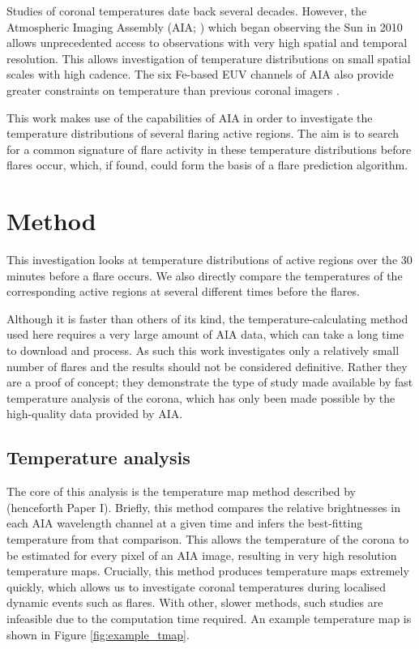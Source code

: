 \documentclass[referee,a4paper,12pt]{swsc}
\begin{document}
\begin{linenumbers}
Studies of coronal temperatures date back several decades. %
However, the Atmospheric Imaging Assembly (AIA; \cite{Lemen2011}) which began observing the Sun in 2010 allows unprecedented access to observations with very high spatial and temporal resolution.
This allows investigation of temperature distributions on small spatial scales with high cadence. %
The six Fe-based EUV channels of AIA also provide greater constraints on temperature than previous coronal imagers \citep{Guennou2012, Guennou2012a}.

This work makes use of the capabilities of AIA in order to investigate the temperature distributions of several flaring active regions.
The aim is to search for a common signature of flare activity in these temperature distributions before flares occur, which, if found, could form the basis of a flare prediction algorithm.

\section{Method}
This investigation looks at temperature distributions of active regions over the 30 minutes before a flare occurs.
We also directly compare the temperatures of the corresponding active regions at several different times before the flares.

Although it is faster than others of its kind, the temperature-calculating method used here requires a very large amount of AIA data, which can take a long time to download and process.
As such this work investigates only a relatively small number of flares and the results should not be considered definitive.
Rather they are a proof of concept; they demonstrate the type of study made available by fast temperature analysis of the corona, which has only been made possible by the high-quality data provided by AIA.

\subsection{Temperature analysis}
The core of this analysis is the temperature map method described by \cite{Leonard} (henceforth Paper I). 
Briefly, this method compares the relative brightnesses in each AIA wavelength channel at a given time and infers the best-fitting temperature from that comparison. %
This allows the temperature of the corona to be estimated for every pixel of an AIA image, resulting in very high resolution temperature maps.
Crucially, this method produces temperature maps extremely quickly, which allows us to investigate coronal temperatures during localised dynamic events such as flares.
With other, slower methods, such studies are infeasible due to the computation time required.
An example temperature map is shown in Figure \ref{fig:example_tmap}.


\end{linenumbers}
\end{document}

